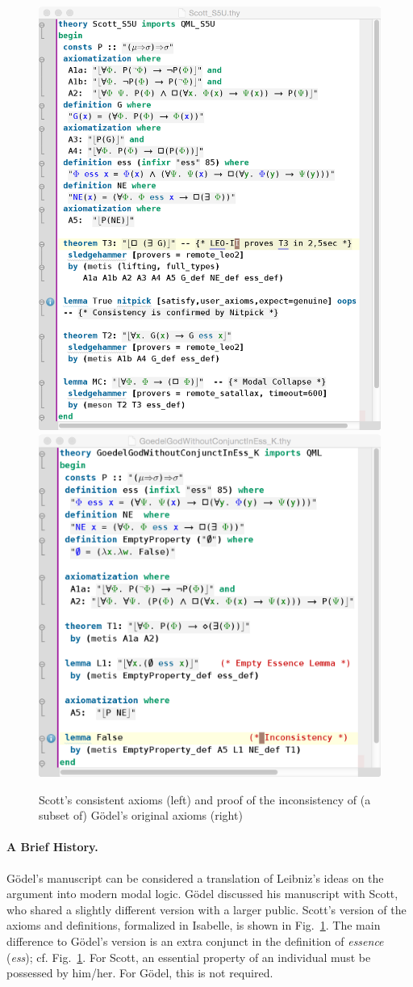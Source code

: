 \documentclass{llncs}
\newcommand{\logic}[1]{\textbf{#1}\xspace}
\newcommand{\SFiveU}{\logic{S5\textsuperscript{U}}}
\begin{document}
\begin{figure}\centering 
  \includegraphics[width=.495\textwidth]{./Scott_S5U.png}
  \includegraphics[width=.495\textwidth]{./InconsistencyIsabelleK.png}
\caption{Scott's consistent axioms (left) and proof of the
  inconsistency of (a subset of) G\"odel's original  axioms (right)}
\label{Scott_Goedel}
\end{figure} 
\paragraph{A Brief History.}\label{sec:history}
G\"odel's manuscript can be considered a translation of Leibniz's
ideas on the argument into modern modal logic. G\"odel
discussed his manuscript with Scott, who shared a slightly different
version with a larger public. Scott's version of the axioms and
definitions, formalized in Isabelle, is shown in
Fig.~\ref{Scott_Goedel}. 
The main difference to G\"odel's version is an
extra conjunct in the definition of \emph{essence} (\emph{ess}); cf. Fig.~\ref{Scott_Goedel}. For Scott,
an essential property of an individual must be possessed by
him/her. For G\"odel, this is not required. 
\end{document}

